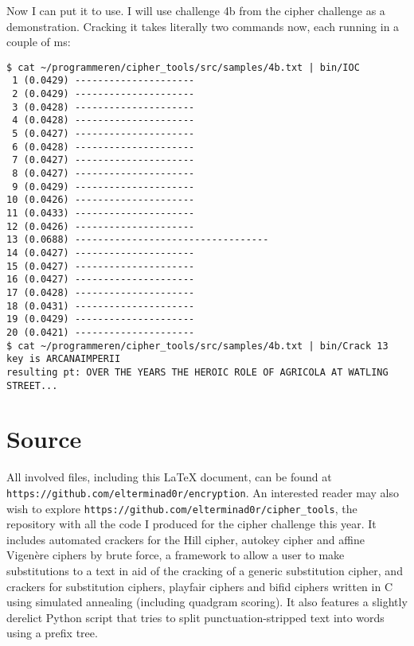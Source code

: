 \documentclass{article}
\begin{document}
    Now I can put it to use. I will use challenge 4b from the cipher challenge
    as a demonstration. Cracking it takes literally two commands now, each
    running in a couple of ms:

\begin{lstlisting}[caption=Cracking 4b, label={lst:iocchart}]
$ cat ~/programmeren/cipher_tools/src/samples/4b.txt | bin/IOC 
 1 (0.0429) ---------------------
 2 (0.0429) ---------------------
 3 (0.0428) ---------------------
 4 (0.0428) ---------------------
 5 (0.0427) ---------------------
 6 (0.0428) ---------------------
 7 (0.0427) ---------------------
 8 (0.0427) ---------------------
 9 (0.0429) ---------------------
10 (0.0426) ---------------------
11 (0.0433) ---------------------
12 (0.0426) ---------------------
13 (0.0688) ----------------------------------
14 (0.0427) ---------------------
15 (0.0427) ---------------------
16 (0.0427) ---------------------
17 (0.0428) ---------------------
18 (0.0431) ---------------------
19 (0.0429) ---------------------
20 (0.0421) ---------------------
$ cat ~/programmeren/cipher_tools/src/samples/4b.txt | bin/Crack 13
key is ARCANAIMPERII
resulting pt: OVER THE YEARS THE HEROIC ROLE OF AGRICOLA AT WATLING STREET...
\end{lstlisting}

    \section{Source} All involved files, including this \LaTeX{} document, can
    be found at \verb|https://github.com/elterminad0r/encryption|. An
    interested reader may also wish to explore
    \verb|https://github.com/elterminad0r/cipher_tools|, the repository with
    all the code I produced for the cipher challenge this year. It includes
    automated crackers for the Hill cipher, autokey cipher and affine
    Vigen\`ere ciphers by brute force, a framework to allow a user to make
    substitutions to a text in aid of the cracking of a generic substitution
    cipher, and crackers for substitution ciphers, playfair ciphers and bifid
    ciphers written in C using simulated annealing (including quadgram
    scoring). It also features a slightly derelict Python script that tries to
    split punctuation-stripped text into
    words using a prefix tree.
\end{document}
